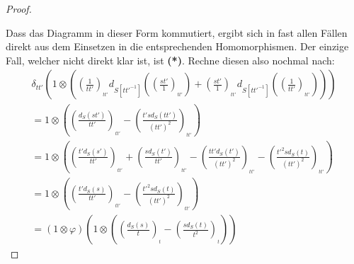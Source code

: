 \documentclass[10pt,a4paper]{report}
\newcommand{\comment}[1]{}
\newcommand{\divR}[2]{\Omega_{#1/#2}}
\newcommand{\divf}[1]{d_{#1}}
\newcommand{\Tensor}[3]{#1 \otimes_{#2} #3}
\newcommand{\tensor}[3]{#1 \otimes #3}
\newcommand{\lok}[2]{#1 [#2^{-1}]}
\newcommand{\loke}[3]{(\frac{#1}{#2})_{_{#3}}}
\begin{document}
\begin{proof}
\begin{center}
\end{center}
Dass das Diagramm in dieser Form kommutiert, ergibt sich in fast allen Fällen direkt aus dem Einsetzen in die entsprechenden Homomorphismen. Der einzige Fall, welcher nicht direkt klar ist, ist \textbf{(*)}. Rechne diesen also nochmal nach:
\begin{gather*}
\delta_{tt'}( \tensor{1}{\lok{S}{tt'}}{( \loke{1}{tt'}{tt'}\divf{\lok{S}{tt'}}(\loke{st'}{1}{tt'}) + \loke{st'}{1}{tt'}\divf{\lok{S}{tt'}}(\loke{1}{tt'}{tt'}))} )\\
= \tensor{1}{\lok{S}{tt'}}{( \loke{\divf{S}(st')}{tt'}{tt'} - \loke{t's\divf{S}(tt')}{(tt')^2}{tt'} )} \\
= \tensor{1}{\lok{S}{tt'}}{( \loke{t'\divf{S}(s')}{tt'}{tt'} + \loke{s\divf{S}(t')}{tt'}{tt'} 
- \loke{tt'\divf{S}(t')}{(tt')^2}{tt'} - \loke{t'^2s\divf{S}(t)}{(tt')^2}{tt'} )} \\
\comment{ = \tensor{1}{\lok{S}{tt'}}{( \loke{t'\divf{S}(s)}{tt'}{tt'} + \loke{s\divf{S}(t')}{tt'}{tt'} - \loke{s\divf{S}(tt')}{tt'}{tt'} - \loke{t'^2s\divf{S}(t)}{(tt')^2}{tt'} )} \\ }
= \tensor{1}{ \lok{S}{tt'}}{( \loke{t'\divf{S}(s)}{tt'}{tt'} - \loke{t'^2s\divf{S}(t)}{(tt')^2}{tt' } )} \\
= (\tensor{1}{\lok{S}{t}}{\varphi})(\tensor{1}{\lok{S}{t}}{( \loke{\divf{S}(s)}{t}{t} - \loke{s\divf{S}(t)}{t^2}{t}  )})

\end{gather*}
\end{proof}
\end{document}
